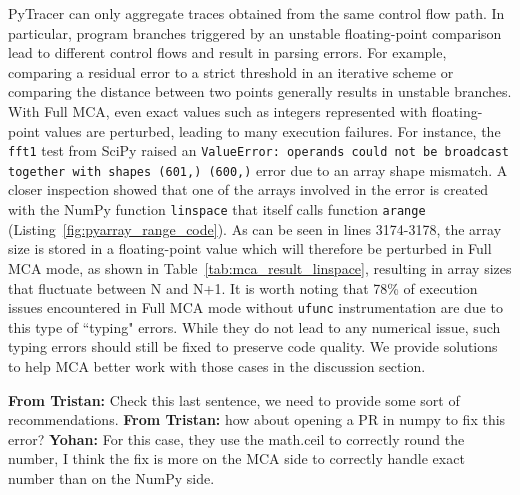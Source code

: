 \documentclass[11pt]{article}
\newcommand{\tristan}[1]{\color{orange}\textbf{From Tristan:} #1\color{black}\xspace}
\newcommand{\Yohan}[1]{\color{green!75!black}\textbf{Yohan:} #1\color{black}\xspace}
\newcommand{\pytracer}[0]{PyTracer\xspace}
\begin{document}
\pytracer can only aggregate traces obtained from the same control flow path. In particular, program branches triggered by an unstable floating-point comparison lead to different control flows and result in parsing errors. 
For example, comparing a residual error to a strict threshold in an iterative scheme or comparing the distance between two points generally results in unstable branches. 
With Full MCA, even exact values such as integers represented with floating-point values are perturbed, leading to many execution failures. For instance,  the \texttt{fft1} test from SciPy raised an \texttt{ValueError: operands could not be broadcast together with shapes (601,) (600,)} error due to an array shape mismatch. A closer inspection showed that one of the arrays involved in the error is created with the NumPy function \texttt{linspace} that itself calls function \texttt{arange} (Listing~\ref{fig:pyarray_range_code}). As can be seen in lines  3174-3178, the array size is stored in a floating-point value which will therefore be perturbed in Full MCA mode, as shown in Table~\ref{tab:mca_result_linspace}, resulting in array sizes that fluctuate
between N and N+1. 
It is worth noting that 78\% of execution issues encountered in Full MCA mode without \texttt{ufunc} instrumentation
are due to this type of ``typing" errors. While they do not lead to any numerical issue, such typing errors should still be fixed to preserve code quality. We provide solutions to help MCA better work with those cases in the discussion section.

\tristan{Check this last sentence, we need to provide some sort of recommendations}. \tristan{how about opening a PR in numpy to fix this error?}
\Yohan{For this case, they use the math.ceil to correctly round the number, I think the fix is more on the MCA side to
correctly handle exact number than on the NumPy side.}


\end{document}
